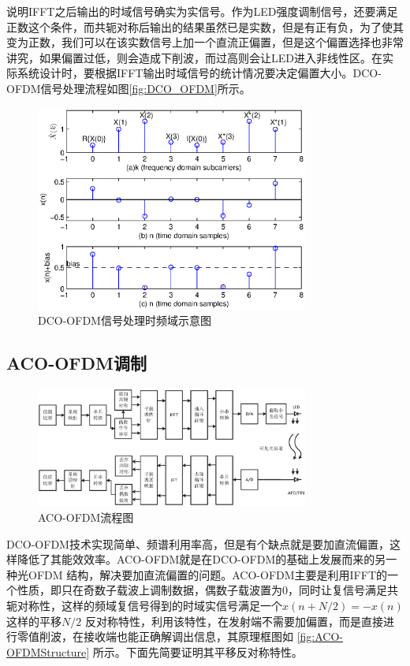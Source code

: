 说明IFFT之后输出的时域信号确实为实信号。作为LED强度调制信号，还要满足正数这个条件，而共轭对称后输出的结果虽然已是实数，但是有正有负，为了使其变为正数，我们可以在该实数信号上加一个直流正偏置，但是这个偏置选择也非常讲究，如果偏置过低，则会造成下削波，而过高则会让LED进入非线性区。在实际系统设计时，要根据IFFT输出时域信号的统计情况要决定偏置大小。DCO-OFDM信号处理流程如图\autoref{fig:DCO_OFDM}所示。
\begin{figure}[htbp]
    \centering
    \includegraphics[width=0.8\textwidth]{figures/chapter-2/DCO_OFDM.eps}
    \caption{DCO-OFDM信号处理时频域示意图}
    \label{fig:DCO_OFDM}
\end{figure}

\subsection{ACO-OFDM调制}

\begin{figure}[h]
    \centering
    \includegraphics[width=0.8\textwidth]{figures/chapter-2/ACO-OFDMStructure.eps}
    \caption{ACO-OFDM流程图}
    \label{fig:ACO-OFDMStructure}
\end{figure}
DCO-OFDM技术实现简单、频谱利用率高，但是有个缺点就是要加直流偏置，这样降低了其能效效率。ACO-OFDM就是在DCO-OFDM的基础上发展而来的另一种光OFDM 结构，解决要加直流偏置的问题。ACO-OFDM主要是利用IFFT的一个性质，即只在奇数子载波上调制数据，偶数子载波置为0，同时让复信号满足共轭对称性，这样的频域复信号得到的时域实信号满足一个$x(n+N/2)=-x(n)$这样的平移$N/2$ 反对称特性，利用该特性，在发射端不需要加偏置，而是直接进行零值削波，在接收端也能正确解调出信息，其原理框图如
\autoref{fig:ACO-OFDMStructure} 所示。下面先简要证明其平移反对称特性。

